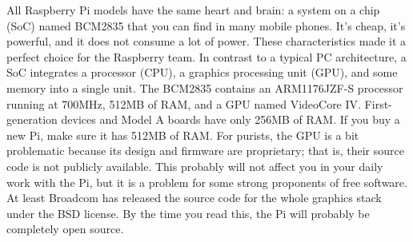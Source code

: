 All Raspberry Pi models have the same heart and brain: a system on a chip
(SoC) named BCM2835\cite{3} that you can find in many mobile phones. It’s cheap,
it’s powerful, and it does not consume a lot of power. These characteristics
made it a perfect choice for the Raspberry team.
In contrast to a typical PC architecture, a SoC integrates a processor (CPU),
a graphics processing unit (GPU), and some memory into a single unit. The
BCM2835 contains an ARM1176JZF-S processor running at 700MHz, 512MB
of RAM, and a GPU named VideoCore IV. First-generation devices and Model
A boards have only 256MB of RAM. If you buy a new Pi, make sure it has
512MB of RAM.
For purists, the GPU is a bit problematic because its design and firmware are
proprietary; that is, their source code is not publicly available. This probably
will not affect you in your daily work with the Pi, but it is a problem for some
strong proponents of free software. At least Broadcom has released the source
code for the whole graphics stack under the BSD license.\cite{4} By the time you
read this, the Pi will probably be completely open source.

